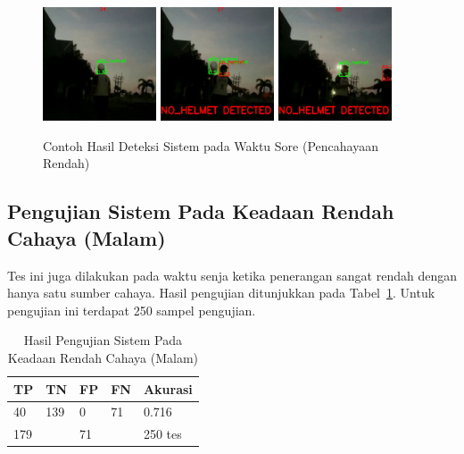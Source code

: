 \begin{figure} [h]
    \centering
    \includegraphics[width=0.3\textwidth]{gambar/sistem-sore/all_alif_5m_pred_Trim (56).png}
    \includegraphics[width=0.3\textwidth]{gambar/sistem-sore/all_alif_5m_pred_Trim (65).png}
    \includegraphics[width=0.3\textwidth]{gambar/sistem-sore/all_alif_5m_pred_Trim (72).png}
    \caption{Contoh Hasil Deteksi Sistem pada Waktu Sore (Pencahayaan Rendah)}
    \label{fig:sys_lowilu_sore}  
\end{figure}

\subsection{Pengujian Sistem Pada Keadaan Rendah Cahaya (Malam)}
\label{subsec:systest_test_lowilu_malam}

\par Tes ini juga dilakukan pada waktu senja ketika penerangan sangat rendah dengan hanya satu sumber cahaya. Hasil pengujian ditunjukkan pada Tabel~\ref{tb:systest_lowillum_dark}. Untuk pengujian ini terdapat 250 sampel pengujian.

\begin{table}
    \centering
    \caption{Hasil Pengujian Sistem Pada Keadaan Rendah Cahaya (Malam)}
    \label{tb:systest_lowillum_dark}
    \begin{tabular}{|l|l|l|l|l|} 
      \hline
      TP & TN                     & FP & FN                 & Akurasi  \\ 
      \hline
      40 & 139                    & 0  & 71                 & 0.716     \\ 
      \hline
      \multicolumn{2}{|l|}{179}   & \multicolumn{2}{l|}{71} &  250 tes    \\
      \hline
    \end{tabular}
\end{table}

